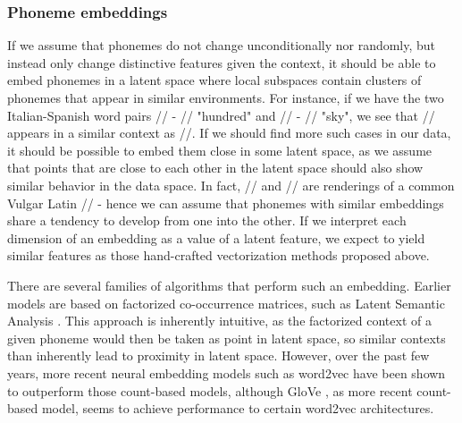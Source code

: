\documentclass[6pt]{article}
\begin{document}
\subsubsection{Phoneme embeddings}
\label{Phoneme embeddings}



If we assume that phonemes do not change unconditionally nor randomly, but instead only change distinctive features given the context, it should be able to embed phonemes in a latent space where local subspaces contain clusters of phonemes that appear in similar environments. For instance, if we have the two Italian-Spanish word pairs // - // "hundred" and  // - // "sky", we see that // appears in a similar context as //. If we should find more such cases in our data, it should be possible to embed them close in some latent space, as we assume that points that are close to each other in the latent space should also show similar behavior in the data space. In fact, // and // are renderings of a common Vulgar Latin // - hence we can assume that phonemes with similar embeddings share a tendency to develop from one into the other. If we interpret each dimension of an embedding as a value of a latent feature, we expect to yield similar features as those hand-crafted vectorization methods proposed above.



There are several families of algorithms that perform such an embedding. Earlier models are based on factorized co-occurrence matrices, such as Latent Semantic Analysis \citep{landauer2013handbook}. This approach is inherently intuitive, as the factorized context of a given phoneme would then be taken as point in latent space, so similar contexts than inherently lead to proximity in latent space. However, over the past few years, more recent neural embedding models such as word2vec \citep{mikolov2013efficient,mikolov2013distributed,goldberg2014word2vec}  have been shown to outperform those count-based models, although GloVe \citep{pennington2014glove}, as more recent count-based model, seems to achieve performance to certain word2vec architectures.
\end{document}
